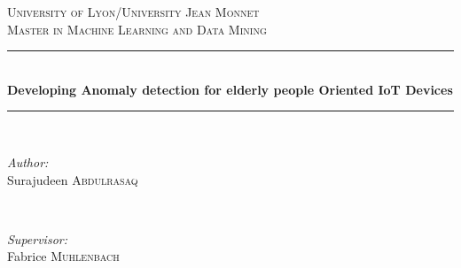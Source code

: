\documentclass[a4paper, parskip=full]{scrartcl}
\date{}
\begin{document}
	

\begin{titlepage}
	
	\newcommand{\HRule}{\rule{\linewidth}{0.5mm}} %
	
	\center %
	
	
	\textsc{\LARGE University of Lyon/University Jean Monnet}\\[1.5cm] %
	\textsc{\Large Master in Machine Learning and Data Mining}\\[0.5cm] %
	
	
	\HRule \\[0.4cm]
	{ \huge \bfseries Developing Anomaly detection for elderly people Oriented IoT Devices}\\[0.4cm] %
	\HRule \\[1.5cm]
	
	
		\begin{minipage}{0.4\textwidth}
			\begin{flushleft} \large
				\emph{Author:}\\
				Surajudeen \textsc{Abdulrasaq} %
			\end{flushleft}
		\end{minipage}
		~
		\begin{minipage}{0.4\textwidth}
			\begin{flushright} \large
				\emph{Supervisor:} \\
				Fabrice  \textsc{Muhlenbach} %
			\end{flushright}
		\end{minipage}\\[2cm]
	

\end{titlepage}
\end{document}
